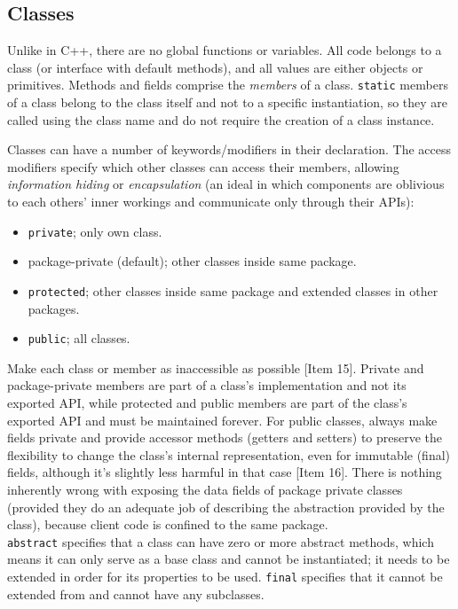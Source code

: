 \documentclass[table, xcdraw]{article}%
\begin{document}
\subsection{Classes}

Unlike in C++, there are no global functions or variables. All code belongs to a class (or interface with default methods), and all values are either objects or primitives. Methods and fields comprise the \emph{members} of a class. \texttt{static} members of a class belong to the class itself and not to a specific instantiation, so they are called using the class name and do not require the creation of a class instance.

Classes can have a number of keywords/modifiers in their declaration. The access modifiers specify which other classes can access their members, allowing \emph{information hiding} or \emph{encapsulation} (an ideal in which components are oblivious to each others’ inner workings and communicate only through their APIs):

\begin{itemize}
    \item \texttt{private}; only own class.
    \item package-private (default); other classes inside same package.
    \item \texttt{protected}; other classes inside same package and extended classes in other packages.
    \item \texttt{public}; all classes.
\end{itemize}

Make each class or member as inaccessible as possible [Item 15]. Private and package-private members are part of a class's implementation and not its exported API, while protected and public members are part of the class's exported API and must be maintained forever. For public classes, always make fields private and provide accessor methods (getters and setters) to preserve the flexibility to change the class's internal representation, even for immutable (final) fields, although it's slightly less harmful in that case [Item 16]. There is nothing inherently wrong with exposing the data fields of package private classes (provided they do an adequate job of describing the abstraction provided by the class), because client code is confined to the same package.\\
\texttt{abstract} specifies that a class can have zero or more abstract methods, which means it can only serve as a base class and cannot be instantiated; it needs to be extended in order for its properties to be used. \texttt{final} specifies that it cannot be extended from and cannot have any subclasses.
\end{document}
